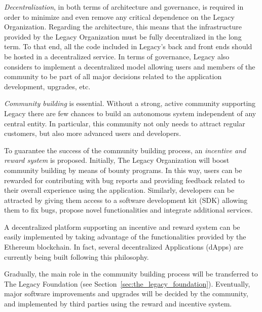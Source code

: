 \textit{Decentralization}, in both terms of architecture and governance, is required in order to minimize and even remove any critical dependence on the Legacy Organization.
Regarding the architecture, this means that the infrastructure provided by the Legacy Organization must be fully decentralized in the long term. To that end, all the code included in Legacy's back and front ends should be hosted in a decentralized service.
In terms of governance, Legacy also considers to implement a decentralized model allowing users and members of the community to be part of all major decisions related to the application development, upgrades, etc.

\textit{Community building} is essential. Without a strong, active community supporting Legacy there are few chances to build an autonomous system independent of any central entity. In particular, this community not only needs to attract regular customers, but also more advanced users and developers.

To guarantee the success of the community building process, an \textit{incentive and reward system} is proposed.
Initially, The Legacy Organization will boost community building by means of bounty programs. In this way, users can be rewarded for contributing with bug reports and providing feedback related to their overall experience using the application.
Similarly, developers can be attracted by giving them access to a software development kit (SDK) allowing them to fix bugs, propose novel functionalities and integrate additional services.

A decentralized platform supporting an incentive and reward system can be easily implemented by taking advantage of the functionalities provided by the Ethereum blockchain. In fact, several decentralized Applications (dApps) are currently being built following this philosophy.

Gradually, the main role in the community building process will be transferred to The Legacy Foundation (see Section~\ref{sec:the_legacy_foundation}). 
Eventually, major software improvements and upgrades will be decided by the community, and implemented by third parties using the reward and incentive system.









